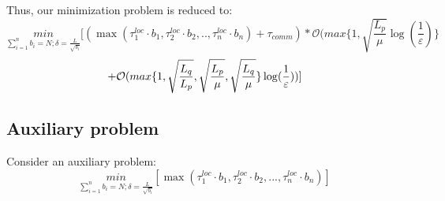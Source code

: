 \documentclass{article}
\begin{document}
Thus, our minimization problem is reduced to:
\begin{equation}
    \label{eq:5}
    \underset{\sum\limits_{i = 1}^{n} b_i = N; \delta = \frac{L}{\sqrt{b_i}}}{min}[(\max(\tau_1^{loc}\cdot b_1, \tau_2^{loc}\cdot b_2, . ., \tau_n^{loc}\cdot b_n) + \tau_{comm}) * \mathcal O(max\{1, \sqrt{\frac{L_p}{\mu}}\log(\frac{1}{\varepsilon})\} 
\end{equation}
\begin{equation}
     \notag
     +
    \mathcal O(max\{1,\sqrt{\frac{L_q}{L_p}}, \sqrt{\frac{L_p}{\mu}}, \sqrt{\frac{L_q}{\mu}}\}\log(\frac{1}{\varepsilon}))]  
\end{equation}

\subsection{Auxiliary problem}
Consider an auxiliary problem:
\begin{equation}
    \label{eq:6}
    \underset{\sum\limits_{i = 1}^{n} b_i = N; \delta = \frac{L}{\sqrt{b_i}}}{min} [\max(\tau_1^{loc}\cdot b_1, \tau_2^{loc}\cdot b_2, ..., \tau_n^{loc}\cdot b_n)]
\end{equation}
\end{document}
